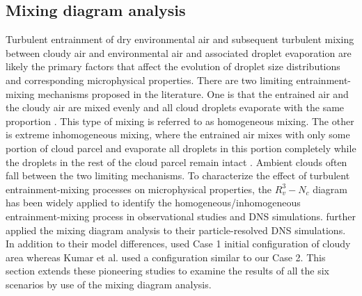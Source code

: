 \documentclass[draft,linenumbers]{agujournal}
\begin{document}
\subsection{Mixing diagram analysis}
Turbulent entrainment of dry environmental air and subsequent turbulent mixing between cloudy air and environmental air and associated droplet evaporation are likely the primary factors that affect the evolution of droplet size distributions and corresponding microphysical properties. There are two limiting entrainment-mixing mechanisms proposed in the literature. One is that the entrained air and the cloudy air are mixed evenly and all cloud droplets evaporate with the same proportion \citep{Warner1973}. This type of mixing is referred to as homogeneous mixing. The other is extreme inhomogeneous mixing, where the entrained air mixes with only some portion of cloud parcel and evaporate all droplets in this portion completely while the droplets in the rest of the cloud parcel remain intact \citep{Baker1980}. Ambient clouds often fall between the two limiting mechanisms. To characterize the effect of turbulent entrainment-mixing processes on microphysical properties, the $R_v^3-N_c$ diagram \citep{Burnet2007Observational} has been widely applied to identify the homogeneous/inhomogeneous entrainment-mixing process in observational studies and DNS simulations.  \citet{Kumar14} further applied the mixing diagram analysis to their particle-resolved DNS simulations. In addition to their model differences,  \citet{And04, And06, And09} used Case 1 initial configuration of cloudy area whereas Kumar et al. used a configuration similar to our Case 2. This section extends these pioneering studies to examine the results of all the six scenarios by use of the mixing diagram analysis.
\end{document}
